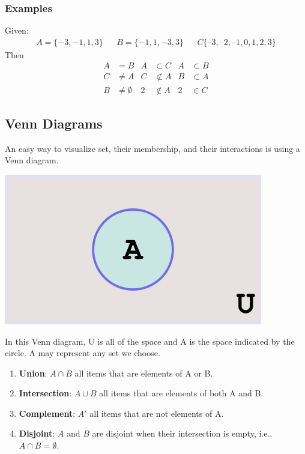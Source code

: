 \documentclass[14pt]{extarticle}
\begin{document}
\subsubsection{Examples}
Given:
\begin{align*}
	A = \{-3,-1,1,3\} & & B=\{-1,1,-3,3\} & & C  \{–3, –2, –1, 0, 1, 2, 3\}
\end{align*}
Then
\begin{align*}
	A &= B & A &\subset C & A &\subset B \\
	C &\neq A & C &\not\subset A & B &\subset A \\
	B &\neq \emptyset & 2 &\notin A & 2 &\in C
\end{align*}

\subsection{Venn Diagrams}
An easy way to visualize set, their membership, and their interactions is using a Venn diagram.
\begin{center}
	\includegraphics[width=0.5\linewidth]{venn-1}
\end{center}
In this Venn diagram, U is all of the space and A is the space indicated by the circle. A may represent any set we choose.

\begin{tcolorbox}[enhanced jigsaw,colback=bg,boxrule=0pt,arc=0pt] 
	\begin{enumerate}
		\item \textbf{Union}: $A \cap B$ all items that are elements of A or B.
		\item \textbf{Intersection}: $A \cup B$ all items that are elements of both A and B.
		\item \textbf{Complement}: $A'$ all items that are not elements of A.
		\item \textbf{Disjoint}: $A$ and $B$ are disjoint when their intersection is empty, i.e., $A \cap B = \emptyset$.
	\end{enumerate}
\end{tcolorbox}
\end{document}
